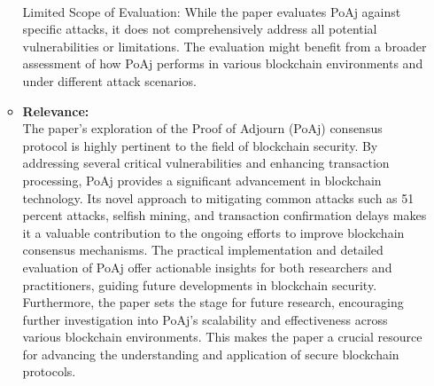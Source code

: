 \documentclass[12pt,a4paper]{article}
\begin{document}
\begin{itemize}
\begin{itemize}
\\
Limited Scope of Evaluation:
While the paper evaluates PoAj against specific attacks, it does not comprehensively address all potential vulnerabilities or limitations. The evaluation might benefit from a broader assessment of how PoAj performs in various blockchain environments and under different attack scenarios.
        \item \textbf{Relevance:} \\
The paper's exploration of the Proof of Adjourn (PoAj) consensus protocol is highly pertinent to the field of blockchain security. By addressing several critical vulnerabilities and enhancing transaction processing, PoAj provides a significant advancement in blockchain technology. Its novel approach to mitigating common attacks such as 51 percent attacks, selfish mining, and transaction confirmation delays makes it a valuable contribution to the ongoing efforts to improve blockchain consensus mechanisms. The practical implementation and detailed evaluation of PoAj offer actionable insights for both researchers and practitioners, guiding future developments in blockchain security. Furthermore, the paper sets the stage for future research, encouraging further investigation into PoAj’s scalability and effectiveness across various blockchain environments. This makes the paper a crucial resource for advancing the understanding and application of secure blockchain protocols.
    \end{itemize}

\end{itemize}
\end{document}
